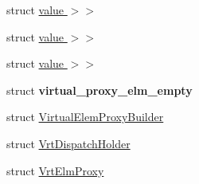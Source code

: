 \begin{DoxyCompactItemize}
\item 
struct \hyperlink{structvt_1_1vrt_1_1collection_1_1_default_map_3_01_collection_t_00_01typename_01std_1_1enable__i0c13cd14d7af17b34311bb8ce93d9804}{value $>$$>$}
\item 
struct \hyperlink{structvt_1_1vrt_1_1collection_1_1_default_map_3_01_collection_t_00_01typename_01std_1_1enable__ib7e55b659c64f165e6a671fb7294e371}{value $>$$>$}
\item 
struct \hyperlink{structvt_1_1vrt_1_1collection_1_1_default_map_3_01_collection_t_00_01typename_01std_1_1enable__id31d055881d6867942086ee5834ad7b4}{value $>$$>$}
\item 
struct {\bfseries virtual\+\_\+proxy\+\_\+elm\+\_\+empty}
\item 
struct \hyperlink{structvt_1_1vrt_1_1collection_1_1_virtual_elem_proxy_builder}{Virtual\+Elem\+Proxy\+Builder}
\item 
struct \hyperlink{structvt_1_1vrt_1_1collection_1_1_vrt_dispatch_holder}{Vrt\+Dispatch\+Holder}
\item 
struct \hyperlink{structvt_1_1vrt_1_1collection_1_1_vrt_elm_proxy}{Vrt\+Elm\+Proxy}
\end{DoxyCompactItemize}
